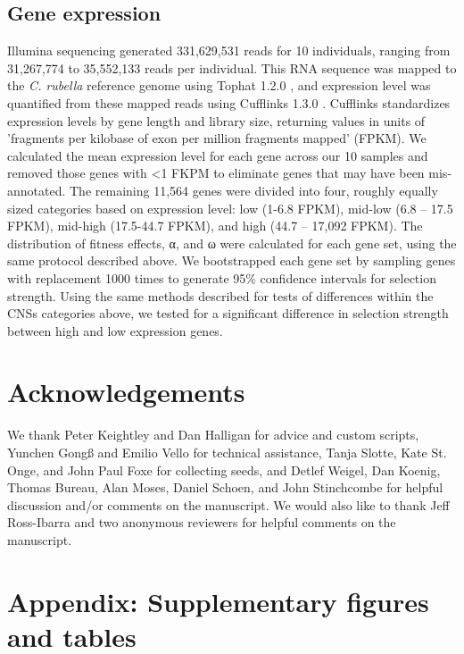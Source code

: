 \subsection{Gene expression}
	Illumina sequencing generated 331,629,531 reads for 10 individuals, ranging from 31,267,774 to 35,552,133 reads per individual. This RNA sequence was mapped to the \textit{C. rubella} reference genome using Tophat 1.2.0 \citep{tophat}, and expression level was quantified from these mapped reads using Cufflinks 1.3.0 \citep{cufflinks}. Cufflinks standardizes expression levels by gene length and library size, returning values in units of 'fragments per kilobase of exon per million fragments mapped' (FPKM). We calculated the mean expression level for each gene across our 10 samples and removed those genes with <1 FKPM to eliminate genes that may have been mis-annotated. The remaining 11,564 genes were divided into four, roughly equally sized categories based on expression level: low (1-6.8 FPKM), mid-low (6.8 – 17.5 FPKM), mid-high (17.5-44.7 FPKM), and high (44.7 – 17,092 FPKM). The distribution of fitness effects, α, and ω were calculated for each gene set, using the same protocol described above. We bootstrapped each gene set by sampling genes with replacement 1000 times to generate 95\% confidence intervals for selection strength. Using the same methods described for tests of differences within the CNSs categories above, we tested for a significant difference in selection strength between high and low expression genes.

\section{Acknowledgements}
We thank Peter Keightley and Dan Halligan for advice and custom scripts, Yunchen Gongß and Emilio Vello for technical assistance, Tanja Slotte, Kate St. Onge, and John Paul Foxe for collecting seeds, and Detlef Weigel, Dan Koenig, Thomas Bureau, Alan Moses, Daniel Schoen, and John Stinchcombe for helpful discussion and/or comments on the manuscript. We would also like to thank Jeff Ross-Ibarra and two anonymous reviewers for helpful comments on the manuscript.

\section{Appendix: Supplementary figures and tables}

